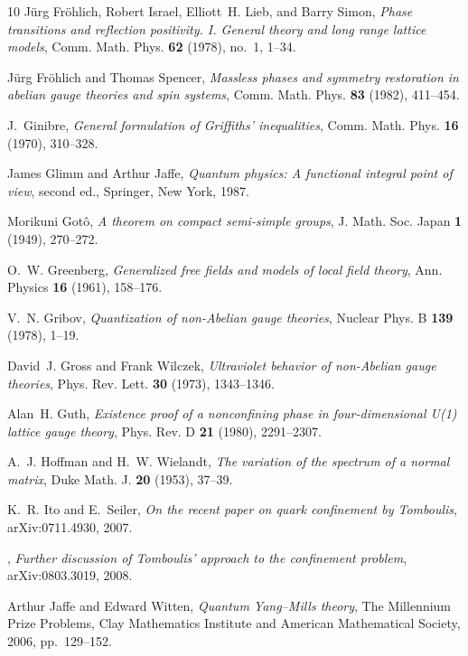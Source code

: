 \documentclass[11pt,a4paper]{amsart}
\theoremstyle{definition}
\theoremstyle{remark}
\numberwithin{equation}{section}
\begin{document}
\begin{thebibliography}{10}
J{\"u}rg Fr{\"o}hlich, Robert Israel, Elliott~H. Lieb, and Barry Simon,
  \emph{Phase transitions and reflection positivity. {I}. {G}eneral theory and
  long range lattice models}, Comm. Math. Phys. \textbf{62} (1978), no.~1,
  1--34.

J{\"u}rg Fr{\"o}hlich and Thomas Spencer, \emph{Massless phases and symmetry
  restoration in abelian gauge theories and spin systems}, Comm. Math. Phys.
  \textbf{83} (1982), 411--454.

J.~Ginibre, \emph{General formulation of {G}riffiths' inequalities}, Comm.
  Math. Phys. \textbf{16} (1970), 310--328.

James Glimm and Arthur Jaffe, \emph{Quantum physics: A functional integral
  point of view}, second ed., Springer, New York, 1987.

Morikuni Got{\^o}, \emph{A theorem on compact semi-simple groups}, J. Math.
  Soc. Japan \textbf{1} (1949), 270--272.

O.~W. Greenberg, \emph{Generalized free fields and models of local field
  theory}, Ann. Physics \textbf{16} (1961), 158--176.

V.~N. Gribov, \emph{Quantization of non-{A}belian gauge theories}, Nuclear
  Phys. B \textbf{139} (1978), 1--19.

David~J. Gross and Frank Wilczek, \emph{Ultraviolet behavior of non-{A}belian
  gauge theories}, Phys. Rev. Lett. \textbf{30} (1973), 1343--1346.

Alan~H. Guth, \emph{Existence proof of a nonconfining phase in four-dimensional
  {U}(1) lattice gauge theory}, Phys. Rev. D \textbf{21} (1980), 2291--2307.

A.~J. Hoffman and H.~W. Wielandt, \emph{The variation of the spectrum of a
  normal matrix}, Duke Math. J. \textbf{20} (1953), 37--39.

K.~R. Ito and E.~Seiler, \emph{On the recent paper on quark confinement by
  {T}omboulis}, arXiv:0711.4930, 2007.

\bysame, \emph{Further discussion of {T}omboulis' approach to the confinement
  problem}, arXiv:0803.3019, 2008.

Arthur Jaffe and Edward Witten, \emph{Quantum {Y}ang--{M}ills theory}, The
  Millennium Prize Problems, Clay Mathematics Institute and American
  Mathematical Society, 2006, pp.~129--152.


\end{thebibliography}
\end{document}
